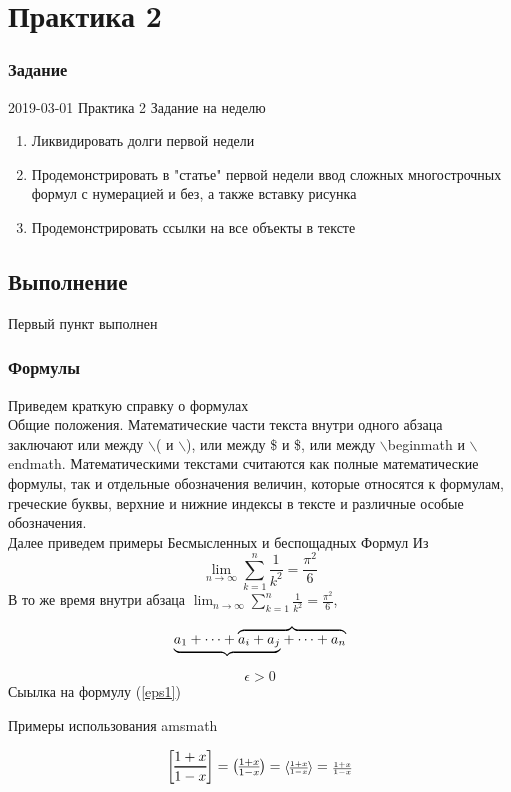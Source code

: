 \documentclass[a4paper,14pt,oneside]{book}
\theoremstyle{plain} %
\theoremstyle{definition} %
\theoremstyle{remark} %
\begin{document}
\chapter{Практика 2}
\subsection{Задание}
2019-03-01 Практика 2 
Задание на неделю 
\begin{enumerate}
\item Ликвидировать долги первой недели 
\item Продемонстрировать в "статье" первой недели ввод сложных многострочных формул с нумерацией и без, а также вставку рисунка 
\item Продемонстрировать ссылки на все объекты в тексте 
\end{enumerate}
\section{Выполнение}
Первый пункт выполнен
\subsection{Формулы}
Приведем краткую справку о формулах \\
Общие положения.
Математические части текста внутри одного абзаца заключают или между $\backslash$( и
$\backslash$), или между \$ и \$, или между  $\backslash$begin{math} и $\backslash$end{math}. Математическими текстами считаются как полные математические формулы, так и отдельные
обозначения величин, которые относятся к формулам, греческие буквы, верхние
и нижние индексы в тексте и различные особые обозначения.\cite{LaTEX1}\\
Далее приведем примеры Бесмысленных и беспощадных Формул Из \cite{LATEX2}
\[
\lim_{n \to \infty}
\sum_{k=1}^n \frac{1}{k^2}
= \frac{\pi^2}{6}
\]
В то же время внутри абзаца $ \lim_{n \to \infty}
\sum_{k=1}^n \frac{1}{k^2}
= \frac{\pi^2}{6} $,

\[
\lefteqn{\underbrace{
\phantom{a_1+\dots+a_i+a_j}}}
a_1+\dots+\overbrace{a_i+a_j+\dots+a_n}
\]

\begin{equation} \label{eps1}
\epsilon > 0
\end{equation}
Сыылка на формулу (\ref{eps1})

Примеры использования  amsmath

\[ 
\genfrac{[}{]}{1pt}{0}{1+x}{1-x} =
\genfrac{(}{)}{}{1}{1+x}{1-x} =
\genfrac{<}{>}{}{2}{1+x}{1-x} =
\genfrac{}{}{}{3}{1+x}{1-x}
\]
\end{document}
